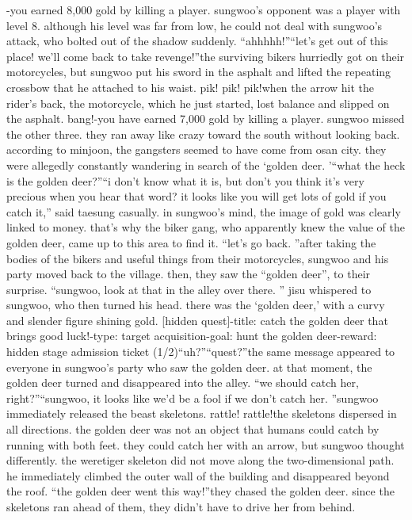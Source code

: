 -you earned 8,000 gold by killing a player.
sungwoo’s opponent was a player with level 8.
 although his level was far from low, he could not deal with sungwoo’s attack, who bolted out of the shadow suddenly.
“ahhhhh!”“let’s get out of this place! we’ll come back to take revenge!”the surviving bikers hurriedly got on their motorcycles, but sungwoo put his sword in the asphalt and lifted the repeating crossbow that he attached to his waist.
pik! pik! pik!when the arrow hit the rider’s back, the motorcycle, which he just started, lost balance and slipped on the asphalt.
bang!-you have earned 7,000 gold by killing a player.
sungwoo missed the other three.
 they ran away like crazy toward the south without looking back.
according to minjoon, the gangsters seemed to have come from osan city.
 they were allegedly constantly wandering in search of the ‘golden deer.
’“what the heck is the golden deer?”“i don’t know what it is, but don’t you think it’s very precious when you hear that word? it looks like you will get lots of gold if you catch it,” said taesung casually.
in sungwoo’s mind, the image of gold was clearly linked to money.
that’s why the biker gang, who apparently knew the value of the golden deer, came up to this area to find it.
“let’s go back.
”after taking the bodies of the bikers and useful things from their motorcycles, sungwoo and his party moved back to the village.
then, they saw the “golden deer”, to their surprise.
“sungwoo, look at that in the alley over there.
”
jisu whispered to sungwoo, who then turned his head.
 there was the ‘golden deer,’ with a curvy and slender figure shining gold.
[hidden quest]-title: catch the golden deer that brings good luck!-type: target acquisition-goal: hunt the golden deer-reward: hidden stage admission ticket (1/2)“uh?”“quest?”the same message appeared to everyone in sungwoo’s party who saw the golden deer.
at that moment, the golden deer turned and disappeared into the alley.
“we should catch her, right?”“sungwoo, it looks like we’d be a fool if we don’t catch her.
”sungwoo immediately released the beast skeletons.
rattle! rattle!the skeletons dispersed in all directions.
 the golden deer was not an object that humans could catch by running with both feet.
 they could catch her with an arrow, but sungwoo thought differently.
the weretiger skeleton did not move along the two-dimensional path.
 he immediately climbed the outer wall of the building and disappeared beyond the roof.
“the golden deer went this way!”they chased the golden deer.
 since the skeletons ran ahead of them, they didn’t have to drive her from behind.

